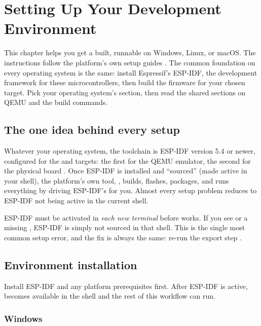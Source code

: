 \chapter{Setting Up Your Development Environment}
\label{ch:firstbuild}

This chapter helps you get a built, runnable \prg on Windows,
Linux, or macOS. The instructions follow the platform's own setup guides
\citep{prg32repo}. The common foundation on every operating system is the same:
install Espressif's ESP-IDF, the development framework for these \riscv
microcontrollers, then build the firmware for your chosen target. Pick your
operating system's section, then read the shared sections on QEMU and the build
commands.

\section{The one idea behind every setup}

Whatever your operating system, the toolchain is ESP-IDF version 5.4 or newer,
configured for the  and  targets: the first for the
QEMU emulator, the second for the physical board \citep{prg32repo,prg32qemu}. Once
ESP-IDF is installed and ``sourced'' (made active in your shell), the platform's
own tool, , builds, flashes, packages, and runs everything
by driving ESP-IDF's  for you. Almost every setup problem
reduces to ESP-IDF not being active in the current shell.

\begin{prgwarn}
ESP-IDF must be activated in \emph{each new terminal} before  works.
If you see  or a missing ,
ESP-IDF is simply not sourced in that shell. This is the single most common
setup error, and the fix is always the same: re-run the export step
\citep{prg32repo}.
\end{prgwarn}

\section{Environment installation}

Install ESP-IDF and any platform prerequisites first. After ESP-IDF is active,
 becomes available in the shell and the rest of this workflow can
run.

\subsection{Windows}

